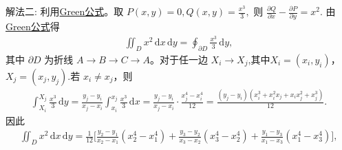 \documentclass[../../main.tex]{subfiles}%
\begin{document}
\begin{solution}
{\color{blue}解法二:} 利用\hyperref[theorem:Green公式--数分]{Green公式}。取
$P(x,y)=0, Q(x,y)=\frac{x^3}{3},$
则
$\frac{\partial Q}{\partial x} - \frac{\partial P}{\partial y} = x^2.$
由\hyperref[theorem:Green公式--数分]{Green公式}得
\begin{align*}
\iint_D x^2 \, \mathrm{d}x\,\mathrm{d}y
= \oint_{\partial D} \frac{x^3}{3} \, \mathrm{d}y,
\end{align*}
其中 $\partial D$ 为折线 $A\to B\to C\to A$。对于任一边 $X_i\to X_j$,其中$X_i=(x_i,y_i)$，$X_j=(x_j,y_j)$.若 $x_i\neq x_j$，则
\begin{align*}
\int_{X_i}^{X_j} \frac{x^3}{3} \, \mathrm{d}y
= \frac{y_j-y_i}{x_j-x_i}\int_{x_i}^{x_j} \frac{x^3}{3} \, \mathrm{d}x
= \frac{y_j-y_i}{x_j-x_i}\cdot \frac{x_j^4-x_i^4}{12} 
= \frac{(y_j-y_i)(x_i^3+x_i^2x_j+x_ix_j^2+x_j^3)}{12}.
\end{align*}
因此
\begin{align*}
\iint_D x^2 \, \mathrm{d}x\,\mathrm{d}y
= \frac{1}{12}\Bigg[
\frac{y_2-y_1}{x_2-x_1}(x_2^4-x_1^4)
+ \frac{y_3-y_2}{x_3-x_2}(x_3^4-x_2^4) 
+ \frac{y_1-y_3}{x_1-x_3}(x_1^4-x_3^4)
\Bigg],
\end{align*}
\end{solution}
\end{document}
